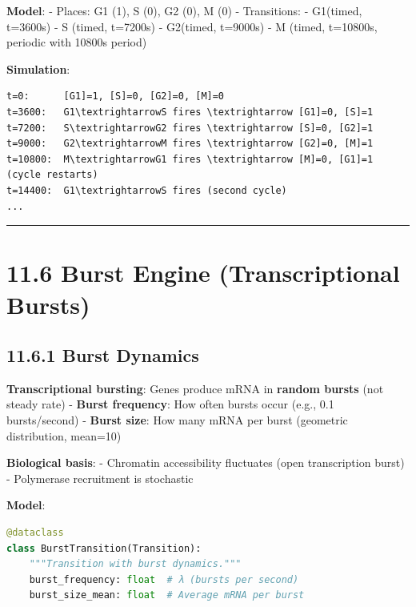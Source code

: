 \textbf{Model}: - Places: G1 (1), S (0), G2 (0), M (0) - Transitions: -
G1\textrightarrowS (timed, t=3600s) - S (timed, t=7200s) - G2\textrightarrowM (timed, t=9000s) -
M (timed, t=10800s, periodic with 10800s period)

\textbf{Simulation}:

\begin{lstlisting}
t=0:      [G1]=1, [S]=0, [G2]=0, [M]=0
t=3600:   G1\textrightarrowS fires \textrightarrow [G1]=0, [S]=1
t=7200:   S\textrightarrowG2 fires \textrightarrow [S]=0, [G2]=1
t=9000:   G2\textrightarrowM fires \textrightarrow [G2]=0, [M]=1
t=10800:  M\textrightarrowG1 fires \textrightarrow [M]=0, [G1]=1 (cycle restarts)
t=14400:  G1\textrightarrowS fires (second cycle)
...
\end{lstlisting}

\begin{center}\rule{0.5\linewidth}{0.5pt}\end{center}

\hypertarget{burst-engine-transcriptional-bursts}{%
\section{11.6 Burst Engine (Transcriptional
Bursts)}\label{burst-engine-transcriptional-bursts}}

\hypertarget{burst-dynamics}{%
\subsection{11.6.1 Burst Dynamics}\label{burst-dynamics}}

\textbf{Transcriptional bursting}: Genes produce mRNA in \textbf{random
bursts} (not steady rate) - \textbf{Burst frequency}: How often bursts
occur (e.g., 0.1 bursts/second) - \textbf{Burst size}: How many mRNA per
burst (geometric distribution, mean=10)

\textbf{Biological basis}: - Chromatin accessibility fluctuates (open \textrightarrow
transcription burst) - Polymerase recruitment is stochastic

\textbf{Model}:

\begin{lstlisting}[language=Python]
@dataclass
class BurstTransition(Transition):
    """Transition with burst dynamics."""
    burst_frequency: float  # λ (bursts per second)
    burst_size_mean: float  # Average mRNA per burst
\end{lstlisting}

